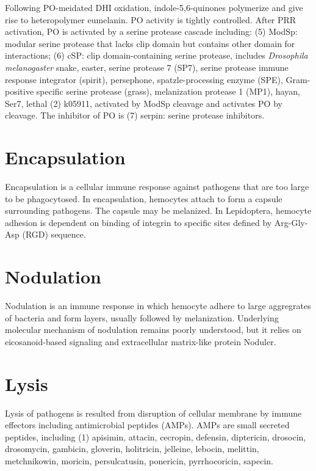 \documentclass[11pt]{article}
\begin{document}
\begin{sloppypar}
Following PO-meidated DHI oxidation, indole-5,6-quinones polymerize and give rise to heteropolymer eumelanin. 
PO activity is tightly controlled. 
After PRR activation, PO is activated by a serine protease cascade including: 
\newline
(5) ModSp: modular serine protease that lacks clip domain but contains other domain for interactions; \newline
(6) cSP: clip domain-containing serine protease, includes \textit{Drosophila melanogaster} 
  snake, easter, serine protease 7 (SP7), serine protease immune response integrator (spirit), persephone, spatzle-processing enzyme (SPE), Gram-positive specific serine protease (grass), melanization protease 1 (MP1), hayan, Ser7, lethal (2) k05911, 
activated by ModSp cleavage and activates PO by cleavage. \newline
The inhibitor of PO is 
\newline
(7) serpin: serine protease inhibitors. \newline

\section*{Encapsulation}
Encapsulation is a cellular immune response against pathogens that are too large to be phagocytosed. 
In encapsulation, hemocytes attach to form a capsule surrounding pathogens. 
The capsule may be melanized. 
In Lepidoptera, hemocyte adhesion is dependent on binding of integrin to specific sites defined by Arg-Gly-Asp (RGD) sequence. 

\section*{Nodulation}
Nodulation is an immune response in which hemocyte adhere to large aggregrates of bacteria and form layers, usually followed by melanization. 
Underlying molecular mechanism of nodulation remains poorly understood, but it relies on eicosanoid-based signaling and extracellular matrix-like protein Noduler. 

\section*{Lysis}
Lysis of pathogens is resulted from disruption of cellular membrane by immune effectors including antimicrobial peptides (AMPs). 
AMPs are small secreted peptides, including 
\newline
(1) apisimin, attacin, cecropin, defensin, diptericin, drosocin, drosomycin, gambicin, gloverin, holitricin, jelleine, lebocin, melittin, metchnikowin, moricin, persulcatusin, ponericin, pyrrhocoricin, sapecin. 


\end{sloppypar}
\end{document}
